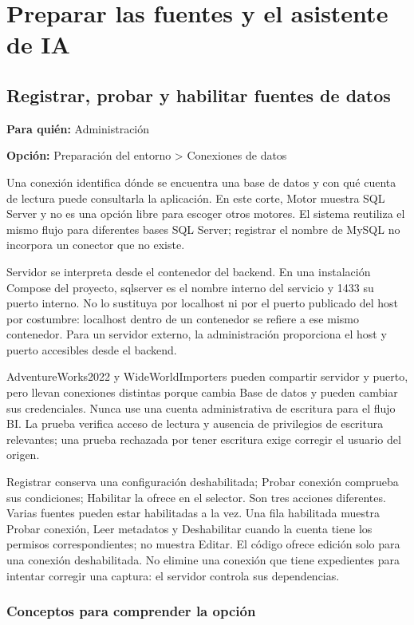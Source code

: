 \chapter{Preparar las fuentes y el asistente de IA}
\section{Registrar, probar y habilitar fuentes de datos}
\label{unidad:operacion_09}
\textbf{Para quién:} Administración\par
\textbf{Opción:} Preparación del entorno > Conexiones de datos\par

Una conexión identifica dónde se encuentra una base de datos y con qué cuenta de lectura puede consultarla la aplicación. En este corte, Motor muestra SQL Server y no es una opción libre para escoger otros motores. El sistema reutiliza el mismo flujo para diferentes bases SQL Server; registrar el nombre de MySQL no incorpora un conector que no existe.

Servidor se interpreta desde el contenedor del backend. En una instalación Compose del proyecto, sqlserver es el nombre interno del servicio y 1433 su puerto interno. No lo sustituya por localhost ni por el puerto publicado del host por costumbre: localhost dentro de un contenedor se refiere a ese mismo contenedor. Para un servidor externo, la administración proporciona el host y puerto accesibles desde el backend.

AdventureWorks2022 y WideWorldImporters pueden compartir servidor y puerto, pero llevan conexiones distintas porque cambia Base de datos y pueden cambiar sus credenciales. Nunca use una cuenta administrativa de escritura para el flujo BI. La prueba verifica acceso de lectura y ausencia de privilegios de escritura relevantes; una prueba rechazada por tener escritura exige corregir el usuario del origen.

Registrar conserva una configuración deshabilitada; Probar conexión comprueba sus condiciones; Habilitar la ofrece en el selector. Son tres acciones diferentes. Varias fuentes pueden estar habilitadas a la vez. Una fila habilitada muestra Probar conexión, Leer metadatos y Deshabilitar cuando la cuenta tiene los permisos correspondientes; no muestra Editar. El código ofrece edición solo para una conexión deshabilitada. No elimine una conexión que tiene expedientes para intentar corregir una captura: el servidor controla sus dependencias.

\subsection{Conceptos para comprender la opción}

